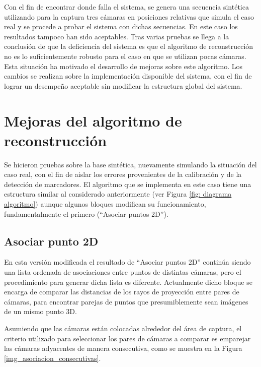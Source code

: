Con el fin de encontrar donde falla el sistema, se genera una secuencia sintética utilizando  para la captura tres cámaras en posiciones relativas que simula el caso real y se procede a probar el sistema con dichas secuencias.  En este caso los resultados tampoco han sido aceptables. Tras varias pruebas se llega  a la conclusión de que la deficiencia del sistema es que el algoritmo de reconstrucción no es lo suficientemente robusto para el caso en que se utilizan pocas cámaras.\\
Esta situación ha motivado el desarrollo de mejoras sobre este algoritmo. Los cambios se realizan sobre la implementación disponible del sistema, con el fin de lograr un desempeño aceptable sin modificar la estructura global del sistema.

\section{Mejoras del algoritmo de reconstrucción}


Se hicieron pruebas sobre la base sintética, nuevamente simulando la situación del caso real, con el fin de aislar los errores provenientes de la calibración y de la detección de marcadores.
El algoritmo que se implementa en este caso tiene una estructura similar al considerado anteriormente (ver Figura \ref{fig: diagrama algoritmo}) aunque algunos bloques modifican su funcionamiento, fundamentalmente el primero (“Asociar puntos 2D”).

\subsection{Asociar punto 2D}

En esta versión modificada el resultado de “Asociar puntos 2D” continúa siendo una lista ordenada de asociaciones entre puntos de distintas cámaras, pero el procedimiento para generar dicha lista es diferente. Actualmente dicho bloque se encarga  de comparar  las distancias de los rayos de proyección entre pares de cámaras, para encontrar parejas de puntos que presumiblemente sean imágenes de un mismo punto 3D.  

Asumiendo que las cámaras están colocadas alrededor del área de captura, el criterio utilizado para seleccionar los pares de cámaras a comparar es emparejar las cámaras adyacentes de manera consecutiva, como se muestra en la Figura \ref{img_asociacion_consecutivas}.

